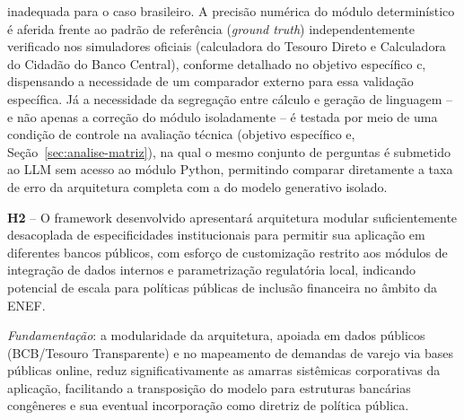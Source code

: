 inadequada para o caso brasileiro. A precis\~ao num\'erica do m\'odulo determin\'istico \'e aferida
frente ao padr\~ao de refer\^encia (\textit{ground truth})
independentemente verificado nos simuladores oficiais (calculadora do
Tesouro Direto e Calculadora do Cidad\~ao do Banco Central), conforme detalhado no objetivo
espec\'ifico c, dispensando a necessidade de um comparador externo
para essa valida\c{c}\~ao espec\'ifica. J\'a a necessidade da
segrega\c{c}\~ao entre c\'alculo e gera\c{c}\~ao de linguagem --
e n\~ao apenas a corre\c{c}\~ao do m\'odulo isoladamente -- \'e
testada por meio de uma condi\c{c}\~ao de controle na avalia\c{c}\~ao
t\'ecnica (objetivo espec\'ifico e, Se\c{c}\~ao~\ref{sec:analise-matriz}),
na qual o mesmo conjunto de perguntas \'e submetido ao LLM sem
acesso ao m\'odulo Python, permitindo comparar diretamente a taxa
de erro da arquitetura completa com a do modelo generativo isolado.

\textbf{H2} -- O framework desenvolvido apresentar\'a arquitetura
modular suficientemente desacoplada de especificidades institucionais
para permitir sua aplica\c{c}\~ao em diferentes bancos p\'ublicos, com
esfor\c{c}o de customiza\c{c}\~ao restrito aos m\'odulos de
integra\c{c}\~ao de dados internos e parametriza\c{c}\~ao regulat\'oria
local, indicando potencial de escala para pol\'iticas p\'ublicas de
inclus\~ao financeira no \^ambito da ENEF.

\textit{Fundamenta\c{c}\~ao}: a modularidade da arquitetura, apoiada em
dados p\'ublicos (BCB/Tesouro Transparente) e no mapeamento de demandas de varejo via
bases p\'ublicas online, reduz significativamente as amarras sist\^emicas
corporativas da aplica\c{c}\~ao, facilitando a transposi\c{c}\~ao do
modelo para estruturas banc\'arias cong\^eneres e sua eventual
incorpora\c{c}\~ao como diretriz de pol\'itica p\'ublica.
